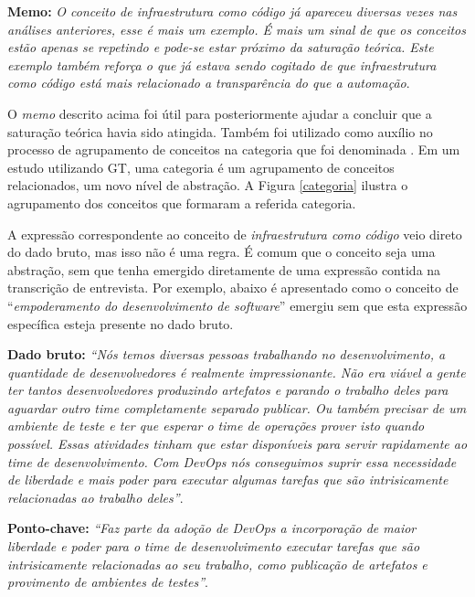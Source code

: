 \textbf{Memo:} \textit{O conceito de infraestrutura como código já apareceu
diversas vezes nas análises anteriores, esse é mais um exemplo. É mais um sinal
de que os conceitos estão apenas se repetindo e pode-se estar próximo da
saturação teórica. Este exemplo também reforça o que já estava sendo cogitado
de que infraestrutura como código está mais relacionado a transparência do que
a automação}.

O {\it memo} descrito acima foi útil para posteriormente ajudar a concluir que
a saturação teórica havia sido atingida. Também foi utilizado como auxílio no
processo de agrupamento de conceitos na categoria que foi denominada
. Em um estudo utilizando \acrshort{GT},
uma categoria é um agrupamento de  conceitos relacionados, um novo nível de
abstração. A Figura \ref{categoria} ilustra o agrupamento dos conceitos
que formaram a referida categoria.


A expressão correspondente ao conceito de \emph{infraestrutura como código}
veio direto do dado bruto, mas isso não é uma regra. É comum que o conceito
seja uma abstração, sem que tenha emergido diretamente de uma expressão contida na
transcrição de entrevista. Por exemplo, abaixo é apresentado como o conceito
de ``\emph{empoderamento do desenvolvimento de software}'' emergiu sem que esta
expressão específica esteja presente no dado bruto.

\textbf{Dado bruto:} {\it ``Nós temos diversas pessoas trabalhando no
desenvolvimento, a quantidade de desenvolvedores é realmente impressionante.
Não era viável a gente ter tantos desenvolvedores produzindo artefatos e
parando o trabalho deles para aguardar outro time completamente separado
publicar. Ou também precisar de um ambiente de teste e ter que esperar o time
de operações prover isto quando possível. Essas atividades tinham que estar
disponíveis para servir rapidamente ao time de desenvolvimento. Com DevOps
nós conseguimos suprir essa necessidade de liberdade e mais poder para executar
algumas tarefas que são intrisicamente relacionadas ao trabalho deles''}.

{\bf Ponto-chave:} \textit{``Faz parte da adoção de DevOps a incorporação
de maior liberdade e poder para o time de desenvolvimento executar tarefas que
são intrisicamente relacionadas ao seu trabalho, como publicação de artefatos
e provimento de ambientes de testes''}.

